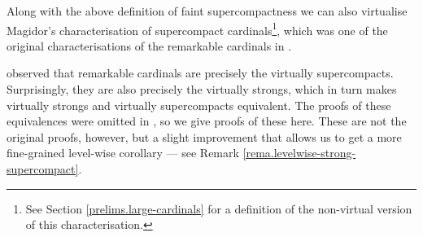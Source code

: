 \documentclass[../../main]{subfiles}
\begin{document}
Along with the above definition of faint supercompactness we can also virtualise Magidor's characterisation of supercompact cardinals\footnote{See Section \ref{prelims.large-cardinals} for a definition of the non-virtual version of this characterisation.}, which was one of the original characterisations of the remarkable cardinals in \cite{Schindler}.


\cite{GitmanSchindler} observed that remarkable cardinals are precisely the virtually supercompacts. Surprisingly, they are also precisely the virtually strongs, which in turn makes virtually strongs and virtually supercompacts equivalent. The proofs of these equivalences were omitted in \cite{GitmanSchindler}, so we give proofs of these here. These are not the original proofs, however, but a slight improvement that allows us to get a more fine-grained level-wise corollary --- see Remark \ref{rema.levelwise-strong-supercompact}.
\end{document}
